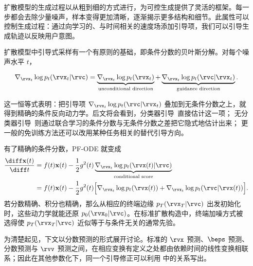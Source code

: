 扩散模型的生成过程以从粗到细的方式进行，为可控生成提供了灵活的框架。每一步都会去除少量噪声，样本变得更加清晰，逐渐揭示更多结构和细节。此属性可以控制生成过程：通过向学习的、与时间相关的速度场添加引导项，我们可以引导生成轨迹以反映用户意图。

扩散模型中引导式采样有一个有原则的基础，即条件分数的贝叶斯分解。对每个噪声水平 $t$，
\begin{mdframed}
\begin{align}
\nabla_{\rvx_t}\log p_t(\rvx_t |\rvc)
=
\underbrace{\nabla_{\rvx_t}\log p_t(\rvx_t)}_{\text{unconditional direction}}
+
\underbrace{\nabla_{\rvx_t}\log p_t(\rvc |\rvx_t)}_{\text{guidance direction}}.
\label{eq:guidance_bayes}
\end{align}
\end{mdframed}
这一恒等式表明：把引导项
$\nabla_{\rvx_t}\log p_t(\rvc|\rvx_t)$ 叠加到无条件分数之上，就得到精确的条件反向动力学。后文将会看到，分类器引导~\citep{dhariwal2021diffusion}直接估计这一项；
无分类器引导~\citep{ho2021classifier}则通过联合学习的条件分数与无条件分数之差把它隐式地估计出来；
更一般的免训练方法还可以改用某种任务相关的替代引导方向。

有了精确的条件分数，PF-ODE 就变成
\begin{align}\label{eq:condition_prob_ode}
\begin{aligned}
    \frac{\diff \mathbf{x}(t)}{\diff t} &= f(t)\mathbf{x}(t) - \frac{1}{2} g^2(t) \underbrace{\nabla_{\rvx_t} \log p_t(\rvx(t) |\rvc)}_{\text{conditional score}} \\
    &= f(t)\mathbf{x}(t) - \frac{1}{2} g^2(t) \Big[ \nabla_{\rvx_t} \log p_t(\rvx(t)) + \nabla_{\rvx_t} \log p_t(\rvc |\rvx(t)) \Big].
\end{aligned}
\end{align}
若分数精确、积分也精确，那么从相应的终端边缘
$p_T(\rvx_T|\rvc)$ 出发初始化时，这些动力学就能还原
$p_0(\rvx_0|\rvc)$。在标准扩散构造中，终端加噪方式被选得使 $p_T(\rvx_T|\rvc)$ 近似等于与条件无关的通常先验。

为清楚起见，下文以分数预测的形式展开讨论。标准的 $\rvx$ 预测、$\beps$ 预测、分数预测与 $\rvv$ 预测之间，在相应变换有定义之处都由依赖时间的线性变换相联系；因此在其他参数化下，同一个引导修正可以利用  中的关系写出。


